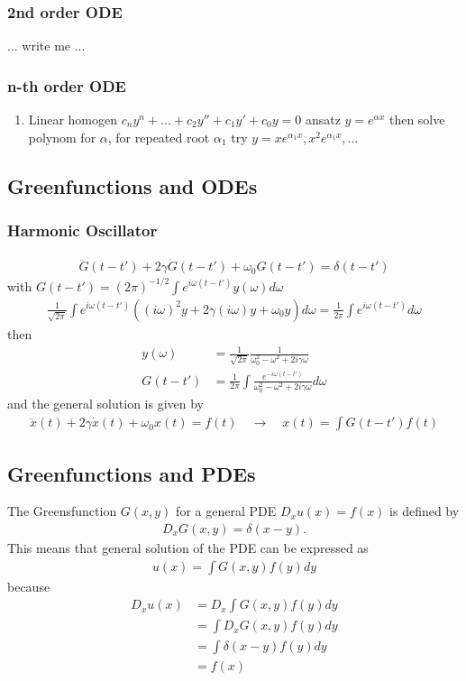 \documentclass[10pt,a4paper]{book}
\theoremstyle{definition}
\begin{document}
\subsubsection{2nd order ODE}
... write me ...

\subsubsection{n-th order ODE}
\begin{enumerate}
\item Linear homogen $c_ny^{n}+...+c_{2}y''+c_{1}y'+c_{0}y=0$ ansatz $y=e^{\alpha x}$ then solve polynom for $\alpha$,  for repeated root $\alpha_1$ try $y=xe^{\alpha_1 x}, x^2e^{\alpha_1 x}, ...$
\end{enumerate}




\subsection{Greenfunctions and ODEs}
\subsubsection{Harmonic Oscillator}
\begin{align}
\ddot{G}(t-t')+2\gamma\dot{G}(t-t')+\omega_0G(t-t')=\delta(t-t')
\end{align}
with $G(t-t')=(2\pi)^{-1/2}\int e^{i\omega (t-t')}y(\omega)d\omega$
\begin{align}
\frac{1}{\sqrt{2\pi}}\int e^{i\omega (t-t')}\left((i\omega)^2y+2\gamma(i\omega)y+\omega_0y\right)d\omega=\frac{1}{2\pi}\int e^{i\omega(t-t')}d\omega
\end{align}
then
\begin{align}
y(\omega)&=\frac{1}{\sqrt{2\pi}}\frac{1}{\omega_0^2-\omega^2+2i\gamma\omega}\\
G(t-t')&=\frac{1}{2\pi}\int \frac{e^{-i\omega(t-t')}}{\omega_0^2-\omega^2+2i\gamma\omega}d\omega
\end{align}
and the general solution is given by
\begin{align}
\ddot{x}(t)+2\gamma\dot{x}(t)+\omega_0x(t)=f(t)\quad\rightarrow\quad
x(t)=\int G(t-t')f(t)
\end{align}

\subsection{Greenfunctions and PDEs}
The Greensfunction $G(x,y)$ for a general PDE $D_x u(x) = f(x)$ is defined by
\begin{align}
    D_x G(x,y) = \delta(x-y).
\end{align}
This means that general solution of the PDE can be expressed as
\begin{align}
    u(x)=\int G(x,y)f(y)dy
\end{align}
because
\begin{align}
    D_x u(x)
    &=D_x \int G(x,y)f(y)dy\\
    &=\int D_x G(x,y)f(y)dy\\
    &=\int \delta(x-y) f(y)dy\\
    &=f(x)
\end{align}
\end{document}

